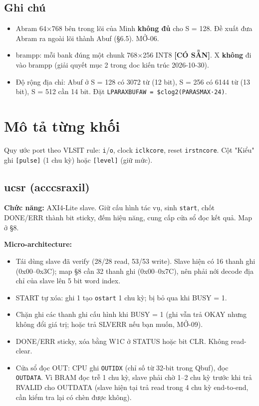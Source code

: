 \documentclass[11pt,a4paper]{article}
\renewcommand{\_}{\oldus\allowbreak}
\newcommand{\statustag}[2]{\textsf{\footnotesize\bfseries\color{#1}[#2]}}
\newcommand{\tagcosan}{\statustag{NavyBlue}{CÓ SẴN}}
\providecommand{\tightlist}{\setlength{\itemsep}{0pt}\setlength{\parskip}{0pt}}
\begin{document}
\subsection{Ghi chú}

\begin{itemize}
\tightlist
\item
  A\_bram 64×768 bên trong lõi của Minh \textbf{không đủ} cho S = 128.
  Đề xuất đưa A\_bram ra ngoài lõi thành A\_buf (§6.5). MỞ-06.
\item
  bram\_pp: mỗi bank đúng một chunk 768×256 INT8 \tagcosan{}. X
  \textbf{không} đi vào bram\_pp (giải quyết mục 2 trong doc kiến trúc
  2026-10-30).
\item
  Độ rộng địa chỉ: A\_buf ở S = 128 có 3072 từ (12 bit), S = 256 có 6144
  từ (13 bit), S = 512 cần 14 bit. Đặt
  \texttt{LPARA\_XBUF\_AW\ =\ \$clog2(PARA\_S\_MAX·24)}.
\end{itemize}

\section{Mô tả từng khối}

Quy ước port theo VLSIT rule: \texttt{i\_}/\texttt{o\_}, clock
\texttt{i\_clk\_core}, reset \texttt{i\_rst\_n\_core}. Cột "Kiểu" ghi
\texttt{{[}pulse{]}} (1 chu kỳ) hoặc \texttt{{[}level{]}} (giữ mức).

\subsection{u\_csr (acc\_csr\_axil)}

\textbf{Chức năng:} AXI4-Lite slave. Giữ cấu hình tác vụ, sinh
\texttt{start}, chốt DONE/ERR thành bit sticky, đếm hiệu năng, cung cấp
cửa sổ đọc kết quả. Map ở §8.

\textbf{Micro-architecture:}

\begin{itemize}
\tightlist
\item
  Tái dùng slave đã verify (28/28 read, 53/53 write). Slave hiện có 16
  thanh ghi (0x00--0x3C); map §8 cần 32 thanh ghi (0x00--0x7C), nên phải
  nới decode địa chỉ của slave lên 5 bit word index.
\item
  START tự xóa: ghi 1 tạo \texttt{o\_start} 1 chu kỳ; bị bỏ qua khi BUSY
  = 1.
\item
  Chặn ghi các thanh ghi cấu hình khi BUSY = 1 (ghi vẫn trả OKAY nhưng
  không đổi giá trị; hoặc trả SLVERR nếu bạn muốn, MỞ-09).
\item
  DONE/ERR sticky, xóa bằng W1C ở STATUS hoặc bit CLR. Không read-clear.
\item
  Cửa sổ đọc OUT: CPU ghi \texttt{OUT\_IDX} (chỉ số từ 32-bit trong
  Q\_buf), đọc \texttt{OUT\_DATA}. Vì BRAM đọc trễ 1 chu kỳ, slave phải
  chờ 1--2 chu kỳ trước khi trả RVALID cho OUT\_DATA (slave hiện tại trả
  read trong 4 chu kỳ end-to-end, cần kiểm tra lại có chèn được không).
\end{itemize}
\end{document}
